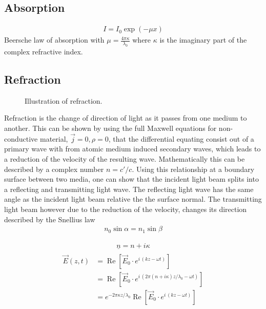 \subsection{Absorption}
% 
\begin{align}
    I = I_0 \exp(-\mu x)
\end{align}
% 
Beersche law of absorption with $\mu = \frac{4\pi \kappa}{\lambda_0}$ where $\kappa$ is the imaginary part of the complex refractive index.
% 
\subsection{Refraction}
% 
\begin{figure}[!t]
\centering
\setlength{\tikzwidth}{\textwidth}
\label{fig:optic_refraction}
\caption{Illustration of refraction.}
\end{figure}
% 
Refraction is the change of direction of light as it passes from one medium to another.
This can be shown by using the full Maxwell equations  for non-conductive material, \ie{} $\vec{j} = 0, \rho = 0$, that the differential equating consist out of a primary wave with from atomic medium induced secondary waves, which leads to a reduction of the velocity of the resulting wave.
Mathematically this can be described by a complex number $n = c' / c$.
Using this relationship at a boundary surface between two media, one can show that the incident light beam splits into a reflecting and transmitting light wave.
The reflecting light wave has the same angle as the incident light beam relative the the surface normal.
The transmitting light beam however due to the reduction of the velocity, changes its direction described by the Snellius law
\begin{align}
    n_0 \sin \alpha = n_1 \sin \beta
\end{align}

% 
\begin{align}
\underline{n} = n + i\kappa
\end{align}
% 
\begin{align}
\begin{split}
\vec{E}(z, t) &= \operatorname{Re}\! \left[\vec{E}_0 \cdot e^{i\, (kz - \omega t)}\right] \\
&= \operatorname{Re}\! \left[\vec{E}_0 \cdot e^{i\, (2\pi(n + i\kappa)z/\lambda_0 - \omega t)}\right] \\
&= e^{-2\pi \kappa z/\lambda_0} \operatorname{Re}\! \left[\vec{E}_0 \cdot e^{i\, (kz - \omega t)}\right]
\end{split}
\end{align}
% 
% 
% 
